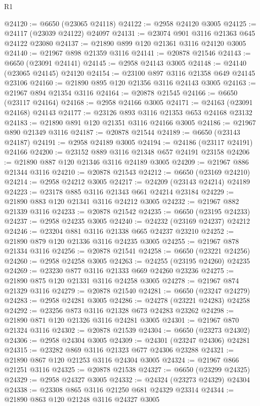 \begin{lexlean}{R1}
\begin{coremodule}
@24120 := @6650 (@23065 @24118)
@24122 := @2958 @24120 @3005
@24125 := @24117 (@23039 @24122) @24097
@24131 := @23074 @901 @3116 @21363 @645 @24122 @23080
@24137 := @21890 @899 @120 @21361 @3116 @24120 @3005
@24140 := @21967 @898 @21359 @3116
@24141 := @20878 @21546
@24143 := @6650 (@23091 @24141)
@24145 := @2958 @24143 @3005
@24148 := @24140 (@23065 @24145) @24120
@24154 := @23100 @897 @3116 @21358 @649 @24145 @23106
@24160 := @21890 @895 @120 @21356 @3116 @24143 @3005
@24163 := @21967 @894 @21354 @3116
@24164 := @20878 @21545
@24166 := @6650 (@23117 @24164)
@24168 := @2958 @24166 @3005
@24171 := @24163 (@23091 @24168) @24143
@24177 := @23126 @893 @3116 @21353 @653 @24168 @23132
@24183 := @21890 @891 @120 @21351 @3116 @24166 @3005
@24186 := @21967 @890 @21349 @3116
@24187 := @20878 @21544
@24189 := @6650 (@23143 @24187)
@24191 := @2958 @24189 @3005
@24194 := @24186 (@23117 @24191) @24166
@24200 := @23152 @889 @3116 @21348 @657 @24191 @23158
@24206 := @21890 @887 @120 @21346 @3116 @24189 @3005
@24209 := @21967 @886 @21344 @3116
@24210 := @20878 @21543
@24212 := @6650 (@23169 @24210)
@24214 := @2958 @24212 @3005
@24217 := @24209 (@23143 @24214) @24189
@24223 := @23178 @885 @3116 @21343 @661 @24214 @23184
@24229 := @21890 @883 @120 @21341 @3116 @24212 @3005
@24232 := @21967 @882 @21339 @3116
@24233 := @20878 @21542
@24235 := @6650 (@23195 @24233)
@24237 := @2958 @24235 @3005
@24240 := @24232 (@23169 @24237) @24212
@24246 := @23204 @881 @3116 @21338 @665 @24237 @23210
@24252 := @21890 @879 @120 @21336 @3116 @24235 @3005
@24255 := @21967 @878 @21334 @3116
@24256 := @20878 @21541
@24258 := @6650 (@23221 @24256)
@24260 := @2958 @24258 @3005
@24263 := @24255 (@23195 @24260) @24235
@24269 := @23230 @877 @3116 @21333 @669 @24260 @23236
@24275 := @21890 @875 @120 @21331 @3116 @24258 @3005
@24278 := @21967 @874 @21329 @3116
@24279 := @20878 @21540
@24281 := @6650 (@23247 @24279)
@24283 := @2958 @24281 @3005
@24286 := @24278 (@23221 @24283) @24258
@24292 := @23256 @873 @3116 @21328 @673 @24283 @23262
@24298 := @21890 @871 @120 @21326 @3116 @24281 @3005
@24301 := @21967 @870 @21324 @3116
@24302 := @20878 @21539
@24304 := @6650 (@23273 @24302)
@24306 := @2958 @24304 @3005
@24309 := @24301 (@23247 @24306) @24281
@24315 := @23282 @869 @3116 @21323 @677 @24306 @23288
@24321 := @21890 @867 @120 @21253 @3116 @24304 @3005
@24324 := @21967 @866 @21251 @3116
@24325 := @20878 @21538
@24327 := @6650 (@23299 @24325)
@24329 := @2958 @24327 @3005
@24332 := @24324 (@23273 @24329) @24304
@24338 := @23308 @865 @3116 @21250 @681 @24329 @23314
@24344 := @21890 @863 @120 @21248 @3116 @24327 @3005

\end{coremodule}
\end{lexlean}

